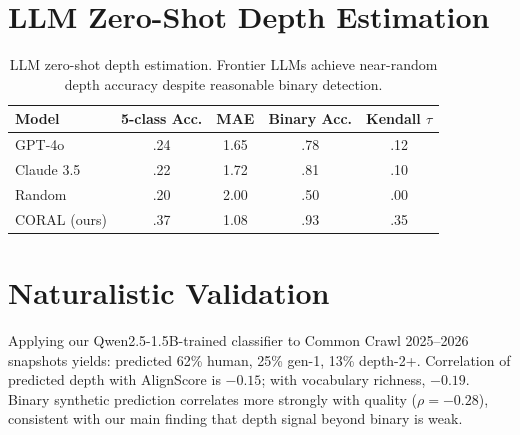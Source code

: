 \documentclass[11pt,a4paper]{article}
\begin{document}
\section{LLM Zero-Shot Depth Estimation}
\label{app:llm}

\begin{table}[h]
\centering
\small
\begin{tabular}{lcccc}
\toprule
\textbf{Model} & \textbf{5-class Acc.} & \textbf{MAE} & \textbf{Binary Acc.} & \textbf{Kendall $\tau$} \\
\midrule
GPT-4o & .24 & 1.65 & .78 & .12 \\
Claude 3.5 & .22 & 1.72 & .81 & .10 \\
Random & .20 & 2.00 & .50 & .00 \\
CORAL (ours) & .37 & 1.08 & .93 & .35 \\
\bottomrule
\end{tabular}
\caption{LLM zero-shot depth estimation. Frontier LLMs achieve near-random depth accuracy despite reasonable binary detection.}
\label{tab:llm_zeroshot}
\end{table}

\section{Naturalistic Validation}
\label{app:naturalistic}

Applying our Qwen2.5-1.5B-trained classifier to Common Crawl 2025--2026 snapshots yields:
predicted 62\% human, 25\% gen-1, 13\% depth-2+.
Correlation of predicted depth with AlignScore is $-0.15$; with vocabulary richness, $-0.19$.
Binary synthetic prediction correlates more strongly with quality ($\rho=-0.28$), consistent with our main finding that depth signal beyond binary is weak.
\end{document}
